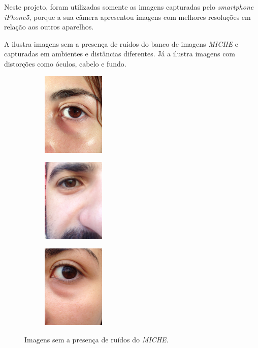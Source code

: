 \par Neste projeto, foram utilizadas somente as imagens capturadas pelo \textit{smartphone} \textit{iPhone5}, porque a sua câmera apresentou imagens com melhores resoluções em relação aos outros aparelhos.

\par A  ilustra imagens sem a presença de ruídos do banco de imagens \textit{MICHE} e capturadas em ambientes e distâncias diferentes. Já a  ilustra imagens com distorções como óculos, cabelo e fundo.

\begin{figure}[h!]
\begin{subfigure}{.3\textwidth}
\centering
\includegraphics[width=3cm,height=4cm]{img/Resultados/miche/boa_1.jpg}
\end{subfigure}\hfill
\begin{subfigure}{.3\textwidth}
\centering
\includegraphics[width=3cm,height=4cm]{img/Resultados/miche/boa_2.jpg}
\end{subfigure}\hfill
\begin{subfigure}{.3\textwidth}
\centering
\includegraphics[width=3cm,height=4cm]{img/Resultados/miche/boa_3.jpg}
\end{subfigure}
\caption{Imagens sem a presença de ruídos do \textit{MICHE}.}
\label{fig:experimentos:miche_boas}
\end{figure}

